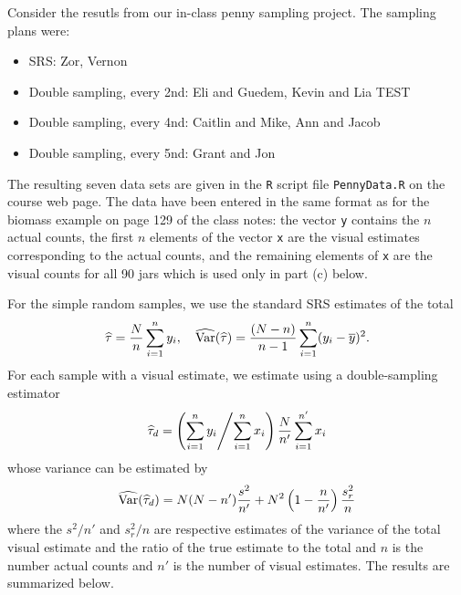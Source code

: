 \documentclass[usenames,dvipsnames]{homework}
\begin{document}
\begin{longproblem} Consider the resutls from our in-class penny sampling project.  The sampling plans were:
  \begin{itemize}
    \item SRS: Zor, Vernon
    \item Double sampling, every 2nd: Eli and Guedem, Kevin and Lia TEST
    \item Double sampling, every 4nd: Caitlin and Mike, Ann and Jacob
    \item Double sampling, every 5nd: Grant and Jon
  \end{itemize}

  The resulting seven data sets are given in the \texttt{R} script file \texttt{PennyData.R} on the course web page.  The data have been entered in the same format as for the biomass example on page 129 of the class notes:  the vector \texttt{y} contains the $n$ actual counts, the first $n$ elements of the vector \texttt{x} are the visual estimates corresponding to the actual counts, and the remaining elements of \texttt{x} are the visual counts for all 90 jars which is used only in part (c) below.


\begin{solution}
For the simple random samples, we use the standard SRS estimates of the total
$$
\hat\tau = \frac Nn \sum_{i=1}^n y_i,\quad \hat{\Var}(\hat\tau) = \frac{(N-n)}{n-1}\sum_{i=1}^n (y_i - \bar y)^2.
$$
For each sample with a visual estimate, we estimate using a double-sampling estimator 
$$
\hat\tau_d = \left( \sum_{i=1}^n y_i \middle/ \sum_{i=1}^n x_i \right) \frac N{n'} \sum_{i=1}^{n'}x_i
$$
whose variance can be estimated by
$$
\hat{\Var}(\hat\tau_d)  = N(N-n')\frac {s^2}{n'} + N^2\left(1-\frac n{n'}\right) \frac{s_r^2}{n}
$$
where the $s^2/n'$ and $s_r^2/n$ are respective estimates of the variance of the total visual estimate and the ratio of the true estimate to the total and $n$ is the number actual counts and $n'$ is the number of visual estimates. The results are summarized below.


\end{solution}
\end{longproblem}
\end{document}
